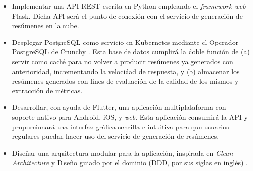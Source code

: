 \begin{itemize} [\textbullet]
	\item Implementar una API REST escrita en Python empleando el \emph{framework web} Flask. Dicha API será el punto de conexión con el servicio de generación de resúmenes en la nube.
	
	\item Desplegar PostgreSQL como servicio en Kubernetes mediante el Operador PostgreSQL de Crunchy \cite{crunchy21}. Esta base de datos cumplirá la doble función de (a) servir como caché para no volver a producir resúmenes ya generados con anterioridad, incrementando la velocidad de respuesta, y (b) almacenar los resúmenes generados con fines de evaluación de la calidad de los mismos y extracción de métricas.
	
	\item Desarrollar, con ayuda de Flutter, una aplicación multiplataforma con soporte nativo para Android, iOS, y \emph{web}. Esta aplicación consumirá la API y proporcionará una interfaz gráfica sencilla e intuitiva para que usuarios regulares puedan hacer uso del servicio de generación de resúmenes.
	
	\item Diseñar una arquitectura modular para la aplicación, inspirada en \emph{Clean Architecture} \cite{martin15} y Diseño guiado por el dominio (DDD, por sus siglas en inglés) \cite{vernon13}.
\end{itemize}
